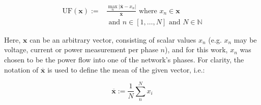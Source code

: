 \begin{equation}
\begin{split}	
	\text{UF}(\textbf{x}) :=& \frac{\max_n |\overline{\textbf{x}} - x_n|}{\overline{\textbf{x}}} \text{ where } x_n \in \textbf{x} \\
	&\text{ and } n \in [1, \dots, N] \text{ and } N \in \mathbb{N}
\end{split}
\label{ch1:equ:unbalance-equation}
\end{equation}

Here, $\textbf{x}$ can be an arbitrary vector, consisting of scalar values $x_n$ (e.g. $x_n$ may be voltage, current or power measurement per phase $n$), and for this work, $x_n$ was chosen to be the power flow into one of the network's phases.
For clarity, the notation of $\overline{\textbf{x}}$ is used to define the mean of the given vector, i.e.:

\begin{equation}
	\overline{\textbf{x}} := \frac{1}{N}\sum_n^N{x_i}
\end{equation}
